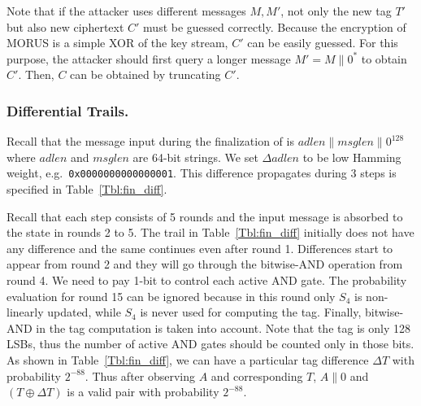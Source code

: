 Note that if the attacker uses different messages $M,M'$, not only the new tag $T'$ but also new ciphertext $C'$ must be guessed correctly. Because the encryption of MORUS is a simple XOR of the key stream, $C'$ can be easily guessed. For this purpose, the attacker should first query a longer message $M'=M\|0^*$ to obtain $C'$. Then, $C$ can be obtained by truncating $C'$.

\subsubsection{Differential Trails.}
Recall that the message input during the finalization of  is $adlen\|msglen\|0^{128}$ where $adlen$ and $msglen$ are 64-bit strings. We set $\Delta adlen$ to be low Hamming weight, e.g.~{\tt 0x0000000000000001}. 
This difference propagates during 3 steps is specified in Table~\ref{Tbl:fin_diff}.

Recall that each step consists of 5 rounds and the input message is absorbed to the state in rounds 2 to 5. The trail in Table~\ref{Tbl:fin_diff} initially does not have any difference and the same continues even after round 1. Differences start to appear from round 2 and they will go through the bitwise-AND operation from round 4. We need to pay 1-bit to control each active AND gate. The probability evaluation for round 15 can be ignored because in this round only $S_4$ is non-linearly updated, while $S_4$ is never used for computing the tag. Finally, bitwise-AND in the tag computation is taken into account. Note that the tag is only 128 LSBs, thus the number of active AND gates should be counted only in those bits. As shown in Table~\ref{Tbl:fin_diff}, we can have a particular tag difference $\Delta T$ with probability $2^{-88}$. Thus after observing $A$ and corresponding $T$, $A\|0$ and $(T \oplus \Delta T)$ is a valid pair with probability $2^{-88}$.

